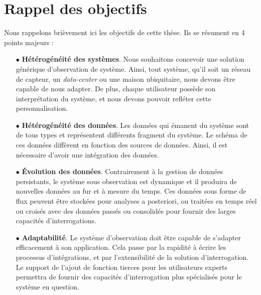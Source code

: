 \section{Rappel des objectifs}\label{sec:conclusion:objectifs}
Nous rappelons brièvement ici les objectifs de cette thèse. Ils se résument en 4 points majeurs :
\begin{itemize}
	\item[$\bullet$] \textbf{Hétérogénéité des systèmes}. Nous souhaitons concevoir une solution générique d'observation de système. Ainsi, tout système, qu'il soit un réseau de capteur, un \textit{data-center} ou une maison ubiquitaire, nous devons être capable de nous adapter. De plus, chaque utilisateur possède son interprétation du système, et nous devons pouvoir refléter cette personnalisation.
	\item[$\bullet$] \textbf{Hétérogénéité des données}. Les données qui émanent du système sont de tous types et représentent différents fragment du système. Le schéma de ces données diffèrent en fonction des sources de données. Ainsi, il est nécessaire d'avoir une intégration des données.
	\item[$\bullet$] \textbf{Évolution des données}. Contrairement à la gestion de données persistants, le système sous observation est dynamique et il produira de nouvelles données au fur et à mesure du temps. Ces données sous forme de flux peuvent être stockées pour analyses a posteriori, ou traitées en temps réel ou croisés avec des données passés ou consolidés pour fournir des larges capacités d'interrogations.
	\item[$\bullet$] \textbf{Adaptabilité}. Le système d'observation doit être capable de s'adapter efficacement à son application. Cela passe par la rapidité à écrire les processus d'intégrations, et par l'extensibilité de la solution d'interrogation. Le support de l'ajout de fonction tierces pour les utilisateurs experts permettra de fournir des capacités d'interrogation plus spécialisés pour le système en question.
\end{itemize}